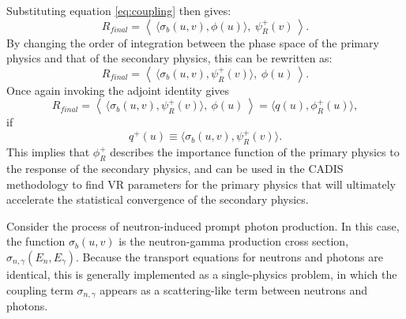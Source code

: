 Substituting equation \ref{eq:coupling} then gives:
\begin{equation}
  R_{final} = \left \langle\  \langle \sigma_b(u,v) , \phi(u) \rangle,\
	\psi_R^{+}(v) \ \right\rangle.
\end{equation}
By changing the order of integration between the phase space of the primary
physics and that of the secondary physics, this can be rewritten as:
\begin{equation}\label{eq:pseudo-response}
  R_{final} = \left \langle \ \langle \sigma_b(u,v) , \psi_R^{+}(v) \rangle,\
	\phi(u) \ \right\rangle.
\end{equation}
Once again invoking the adjoint identity gives
\begin{equation}
  R_{final} = \left \langle \ \langle \sigma_b(u,v) , \psi_R^{+}(v) \rangle,\
	\phi(u) \ \right\rangle = \langle q(u), \phi_R^{+}(u) \rangle,
\end{equation}
if
\begin{equation}
  q^{+}(u) \equiv \langle \sigma_b(u,v) , \psi_R^{+}(v) \rangle.
\end{equation}
This implies that $\phi_R^{+}$ describes the importance function of the
primary physics to the response of the secondary physics, and can be used in
the CADIS methodology to find VR parameters for the primary physics
that will ultimately accelerate the statistical convergence of the secondary
physics.

%

Consider the process of neutron-induced prompt photon production.
In this case, the function $\sigma_b(u,v)$ is the neutron-gamma production
cross section, $\sigma_{n,\gamma}(E_n,E_\gamma)$.  Because the transport
equations for neutrons and photons are identical, this is generally
implemented as a single-physics problem, in which the coupling term
$\sigma_{n,\gamma}$ appears as a scattering-like term between neutrons
and photons.

